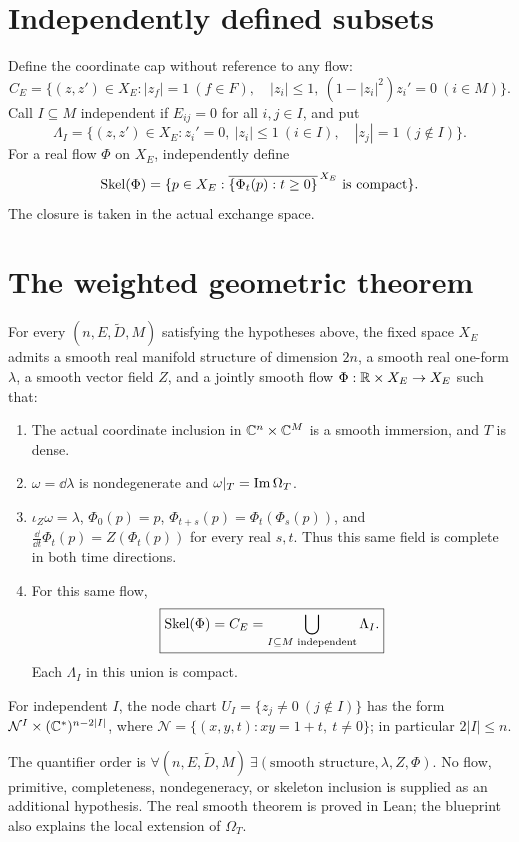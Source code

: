 \section{Independently defined subsets}
Define the coordinate cap without reference to any flow:
\[
 C_E=\{(z,z')\in X_E: |z_f|=1\ (f\in F),\quad
 |z_i|\le1,\ (1-|z_i|^2)z_i'=0\ (i\in M)\}.
\]
Call $I\subseteq M$ independent if $E_{ij}=0$ for all $i,j\in I$, and put
\[
 \Lambda_I=\{(z,z')\in X_E:
 z_i'=0,\ |z_i|\le1\ (i\in I),\quad |z_j|=1\ (j\notin I)\}.
\]
For a real flow $\Phi$ on $X_E$, independently define
\[
 \operatorname{Skel}(\Phi)=\{p\in X_E:
 \overline{\{\Phi_t(p):t\ge0\}}^{\,X_E}\text{ is compact}\}.
\]
The closure is taken in the actual exchange space.

\section{The weighted geometric theorem}
\begin{theorem}\label{thm:target}
For every $(n,E,\widetilde D,M)$ satisfying the hypotheses above, the
fixed space $X_E$ admits a smooth real manifold structure of dimension
$2n$, a smooth real one-form $\lambda$, a smooth vector field $Z$, and
a jointly smooth flow $\Phi:\mathbb R\times X_E\to X_E$ such that:
\begin{enumerate}
\item The actual coordinate inclusion in $\mathbb C^n\times\mathbb C^M$ is a smooth
immersion, and $T$ is dense.
\item $\omega=\dd\lambda$ is nondegenerate and
$\omega|_T=\operatorname{Im}\Omega_T$.
\item $\iota_Z\omega=\lambda$, $\Phi_0(p)=p$,
$\Phi_{t+s}(p)=\Phi_t(\Phi_s(p))$, and
$\frac{\dd}{\dd t}\Phi_t(p)=Z(\Phi_t(p))$ for every real $s,t$.
Thus this same field is complete in both time directions.
\item For this same flow,
\[
 \boxed{\operatorname{Skel}(\Phi)=C_E=
 \bigcup_{I\subseteq M\text{ independent}}\Lambda_I.}
\]
Each $\Lambda_I$ in this union is compact.
\end{enumerate}
For independent $I$, the node chart
$U_I=\{z_j\ne0\ (j\notin I)\}$ has the form
$\mathcal N^{I}\times(\mathbb C^*)^{n-2|I|}$, where
$\mathcal N=\{(x,y,t):xy=1+t,\ t\ne0\}$; in particular $2|I|\le n$.
\end{theorem}
The quantifier order is $\forall(n,E,\widetilde D,M)\ \exists
(\text{smooth structure},\lambda,Z,\Phi)$. No flow, primitive,
completeness, nondegeneracy, or skeleton inclusion is supplied as an
additional hypothesis. The real smooth theorem is proved in Lean;
the blueprint also explains the local extension of $\Omega_T$.

